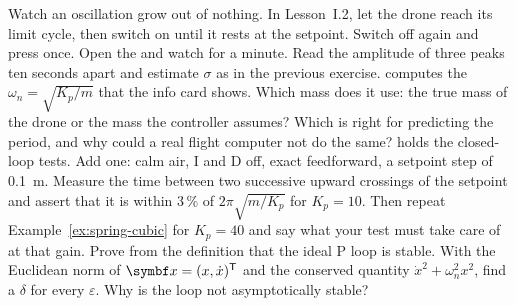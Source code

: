\begin{exercises}
\exercise[2] Watch an oscillation grow out of nothing. In Lesson~I.2, let the drone reach its limit cycle, then switch \Dt on until it rests at the setpoint. Switch \Dt off again and press  once. Open the  and watch for a minute. Read the amplitude of three peaks ten seconds apart and estimate $\sigma$ as in the previous exercise.
\exercise[2]  computes the $\omega_n = \sqrt{K_p/m}$ that the info card shows. Which mass does it use: the true mass of the drone or the mass the controller assumes? Which is right for predicting the period, and why could a real flight computer not do the same?
\exercise[3]  holds the closed-loop tests. Add one: calm air, I and D off, exact feedforward, a setpoint step of \SI{0.1}{m}. Measure the time between two successive upward crossings of the setpoint and assert that it is within 3\,\% of $2\pi\sqrt{m/K_p}$ for $K_p = 10$. Then repeat Example~\ref{ex:spring-cubic} for $K_p = 40$ and say what your test must take care of at that gain.
\exercise[3] Prove from the definition that the ideal P loop is stable. With the Euclidean norm of $\vx = (x, \dot x)^\T$ and the conserved quantity $\dot x^2 + \omega_n^2 x^2$, find a $\delta$ for every $\varepsilon$. Why is the loop not asymptotically stable?
\end{exercises}
